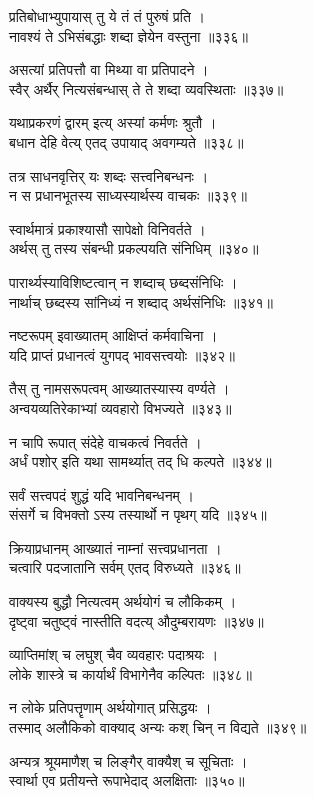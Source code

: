प्रतिबोधाभ्युपायास् तु ये तं तं पुरुषं प्रति ।\\नावश्यं ते ऽभिसंबद्धाः शब्दा ज्ञेयेन वस्तुना ॥३३६॥

असत्यां प्रतिपत्तौ वा मिथ्या वा प्रतिपादने ।\\स्वैर् अर्थैर् नित्यसंबन्धास् ते ते शब्दा व्यवस्थिताः ॥३३७॥

यथाप्रकरणं द्वारम् इत्य् अस्यां कर्मणः श्रुतौ ।\\बधान देहि वेत्य् एतद् उपायाद् अवगम्यते ॥३३८॥

तत्र साधनवृत्तिर् यः शब्दः सत्त्वनिबन्धनः ।\\न स प्रधानभूतस्य साध्यस्यार्थस्य वाचकः ॥३३९॥

स्वार्थमात्रं प्रकाश्यासौ सापेक्षो विनिवर्तते ।\\अर्थस् तु तस्य संबन्धी प्रकल्पयति संनिधिम् ॥३४०॥

पारार्थ्यस्याविशिष्टत्वान् न शब्दाच् छब्दसंनिधिः ।\\नार्थाच् छब्दस्य सांनिध्यं न शब्दाद् अर्थसंनिधिः ॥३४१॥

नष्टरूपम् इवाख्यातम् आक्षिप्तं कर्मवाचिना ।\\यदि प्राप्तं प्रधानत्वं युगपद् भावसत्त्वयोः ॥३४२॥

तैस् तु नामसरूपत्वम् आख्यातस्यास्य वर्ण्यते ।\\अन्वयव्यतिरेकाभ्यां व्यवहारो विभज्यते ॥३४३॥

न चापि रूपात् संदेहे वाचकत्वं निवर्तते ।\\अर्धं पशोर् इति यथा सामर्थ्यात् तद् धि कल्पते ॥३४४॥

सर्वं सत्त्वपदं शुद्धं यदि भावनिबन्धनम् ।\\संसर्गे च विभक्तो ऽस्य तस्यार्थो न पृथग् यदि ॥३४५॥

क्रियाप्रधानम् आख्यातं नाम्नां सत्त्वप्रधानता ।\\चत्वारि पदजातानि सर्वम् एतद् विरुध्यते ॥३४६॥

वाक्यस्य बुद्धौ नित्यत्वम् अर्थयोगं च लौकिकम् ।\\दृष्ट्वा चतुष्ट्वं नास्तीति वदत्य् औदुम्बरायणः ॥३४७॥

व्याप्तिमांश् च लघुश् चैव व्यवहारः पदाश्रयः ।\\लोके शास्त्रे च कार्यार्थं विभागेनैव कल्पितः ॥३४८॥

न लोके प्रतिपत्तॄणाम् अर्थयोगात् प्रसिद्धयः ।\\तस्माद् अलौकिको वाक्याद् अन्यः कश् चिन् न विद्यते ॥३४९॥

अन्यत्र श्रूयमाणैश् च लिङ्गैर् वाक्यैश् च सूचिताः ।\\स्वार्था एव प्रतीयन्ते रूपाभेदाद् अलक्षिताः ॥३५०॥

